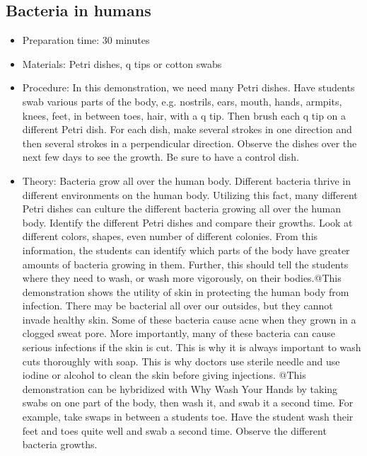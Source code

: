 \subsection{Bacteria in humans}
\begin{itemize}
\item{Preparation time: 30 minutes}
\item{Materials: Petri dishes, q tips or cotton swabs}
\item{Procedure: In this demonstration, we need many Petri dishes. Have students swab various parts of the body, e.g. nostrils, ears, mouth, hands, armpits, knees, feet, in between toes, hair, with a q tip. Then brush each q tip on a different Petri dish. For each dish, make several strokes in one direction and then several strokes in a perpendicular direction. Observe the dishes over the next few days to see the growth. Be sure to have a control dish.}
\item{Theory: Bacteria grow all over the human body. Different bacteria thrive in different environments on the human body. Utilizing this fact, many different Petri dishes can culture the different bacteria growing all over the human body. Identify the different Petri dishes and compare their growths. Look at different colors, shapes, even number of different colonies. From this information, the students can identify which parts of the body have greater amounts of bacteria growing in them. Further, this should tell the students where they need to wash, or wash more vigorously, on their bodies.@This demonstration shows the utility of skin in protecting the human body from infection. There may be bacterial all over our outsides, but they cannot invade healthy skin. Some of these bacteria cause acne when they grown in a clogged sweat pore. More importantly, many of these bacteria can cause serious infections if the skin is cut. This is why it is always important to wash cuts thoroughly with soap. This is why doctors use sterile needle and use iodine or alcohol to clean the skin before giving injections. @This demonstration can be hybridized with Why Wash Your Hands by taking swabs on one part of the body, then wash it, and swab it a second time. For example, take swaps in between a students toe. Have the student wash their feet and toes quite well and swab a second time. Observe the different bacteria growths. }
\end{itemize}

